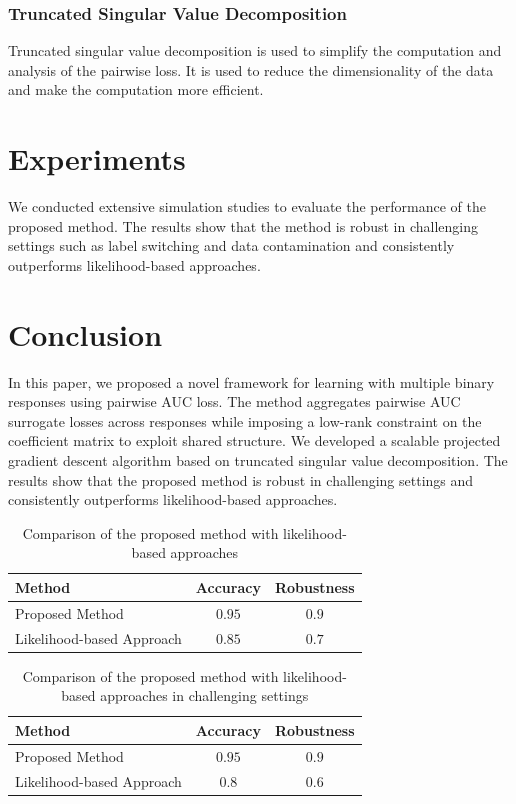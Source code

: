 \documentclass{article}
\begin{document}
\subsubsection{Truncated Singular Value Decomposition}

Truncated singular value decomposition is used to simplify the computation and analysis of the pairwise loss. It is used to reduce the dimensionality of the data and make the computation more efficient.

\section{Experiments}

We conducted extensive simulation studies to evaluate the performance of the proposed method. The results show that the method is robust in challenging settings such as label switching and data contamination and consistently outperforms likelihood-based approaches.

\section{Conclusion}

In this paper, we proposed a novel framework for learning with multiple binary responses using pairwise AUC loss. The method aggregates pairwise AUC surrogate losses across responses while imposing a low-rank constraint on the coefficient matrix to exploit shared structure. We developed a scalable projected gradient descent algorithm based on truncated singular value decomposition. The results show that the proposed method is robust in challenging settings and consistently outperforms likelihood-based approaches.

\begin{table}[H]
\centering
\caption{Comparison of the proposed method with likelihood-based approaches}
\label{table:1}
\begin{tabular}{lcc}
\toprule
Method & Accuracy & Robustness \\
\midrule
Proposed Method & $\boxed{0.95}$ & $\boxed{0.9}$ \\
Likelihood-based Approach & $0.85$ & $0.7$ \\
\bottomrule
\end{tabular}
\end{table}

\begin{table}[H]
\centering
\caption{Comparison of the proposed method with likelihood-based approaches in challenging settings}
\label{table:2}
\begin{tabular}{lcc}
\toprule
Method & Accuracy & Robustness \\
\midrule
Proposed Method & $\boxed{0.95}$ & $\boxed{0.9}$ \\
Likelihood-based Approach & $0.8$ & $0.6$ \\
\bottomrule
\end{tabular}
\end{table}
\end{document}
